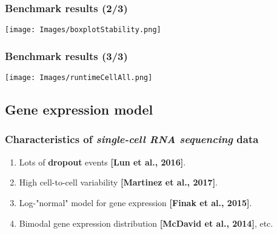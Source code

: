 \documentclass{beamer}
\begin{document}
\begin{frame}
\frametitle{Benchmark results (2/3)}

\begin{center}
\texttt{[image: Images/boxplotStability.png]}
\end{center}

\end{frame}

\begin{frame}
\frametitle{Benchmark results (3/3)}

\begin{center}
\texttt{[image: Images/runtimeCellAll.png]}
\end{center}

\end{frame}

\subsection{Gene expression model}

\begin{frame}
\tableofcontents[currentsubsection]
\end{frame}

\begin{frame}
\frametitle{Characteristics of \textit{\textbf{single-cell} RNA sequencing} data}

\begin{alertblock}{}
\begin{enumerate}[<+>]
\bigskip
\item Lots of \textbf{dropout} events \textbf{[Lun et al., 2016]}.
\item High cell-to-cell variability \textbf{[Martinez et al., 2017]}.
\item Log-"normal" model for gene expression \textbf{[Finak et al., 2015]}. 
\item Bimodal gene expression distribution \textbf{[McDavid et al., 2014]}, etc.
\bigskip
\end{enumerate}
\end{alertblock}

\end{frame}
\end{document}
